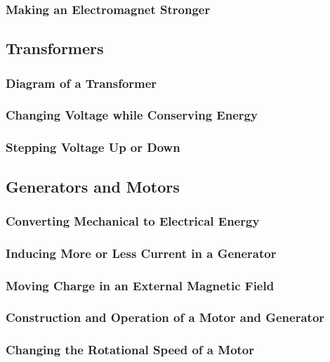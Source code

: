 \documentclass[../main-physics-problems.tex]{subfiles}
\begin{document}
\subsubsection{Making an Electromagnet Stronger}

\subsection{Transformers}

\subsubsection{Diagram of a Transformer}

\subsubsection{Changing Voltage while Conserving Energy}

\subsubsection{Stepping Voltage Up or Down}

\subsection{Generators and Motors}

\subsubsection{Converting Mechanical to Electrical Energy}

\subsubsection{Inducing More or Less Current in a Generator}

\subsubsection{Moving Charge in an External Magnetic Field}

\subsubsection{Construction and Operation of a Motor and Generator}

\subsubsection{Changing the Rotational Speed of a Motor}
\end{document}

